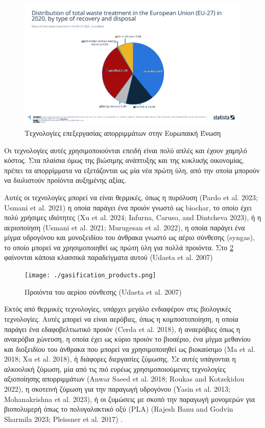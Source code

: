 \documentclass[11pt]{article}
\begin{document}
\begin{figure}[htbp]
\centering
\includegraphics[width=.9\linewidth]{../plots/statistics/statistic_waste_treatment_technologies_europe_2020.png}
\caption{\label{fig:org22664b2}Τεχνολογίες επεξεργασίας απορριμμάτων στην Ευρωπαική Ένωση}
\end{figure}

Οι τεχνολογίες αυτές χρησιμοποιούνται επειδή είναι πολύ απλές και έχουν χαμηλό κόστος. Στα πλαίσια όμως της βιώσιμης ανάπτυξης και της κυκλικής οικονομίας, πρέπει τα απορρίμματα να εξετάζονται ως μία νέα πρώτη ύλη, από την οποία μπορούν να διυλιστούν προϊόντα αυξημένης αξίας.

Αυτές οι τεχνολογίες μπορεί να είναι θερμικές, όπως η πυρόλυση (Pardo et al. 2023; Usmani et al. 2021) η οποία παράγει ένα προιόν γνωστό ως biochar, το οποίο έχει πολύ χρήσιμες ιδιότητες (Xu et al. 2024; Infurna, Caruso, and Dintcheva 2023), ή η αεριοποίηση (Usmani et al. 2021; Murugesan et al. 2022), η οποία παράγει ένα μίγμα υδρογόνου και μονοξειδίου του άνθρακα γνωστό ως αέριο σύνθεσης (syngas), το οποίο μπορεί να χρησιμοποιηθεί ως πρώτη ύλη για πολλά προιόντα. Στο \figurename  \ref{fig:org0e9372b} φαίνονται κάποια κλασσικά παραδείγματα αυτού (Udaeta et al. 2007)

\begin{figure}[htbp]
\centering
\texttt{[image: ./gasification\_products.png]}
\caption[Προιόντα του αερίου σύνθεσης]{\label{fig:org0e9372b}Προιόντα του αερίου σύνθεσης (Udaeta et al. 2007)}
\end{figure}

Εκτός από θερμικές τεχνολογίες, υπάρχει μεγάλο ενδιαφέρον στις βιολογικές τεχνολογίες. Αυτές μπορεί να είναι αερόβιες, όπως η κομποστοποίηση, η οποία παράγει ένα εδαφοβελτιωτικό προιόν (Cerda et al. 2018), ή αναερόβιες όπως η αναερόβια χώνευση, η οποία έχει ως κύριο προιόν το βιοαέριο, ένα μίγμα μεθανίου και διοξειδίου του άνθρακα που μπορεί να χρησιμοποιηθεί ως βιοκαύσιμο (Ma et al. 2018; Xu et al. 2018), ή διάφορες διεργασίες ζύμωσης. Σε αυτές υπάγονται η αλκοολική ζύμωση, μία από τις πιό ευρέως χρησιμοποιούμενες τεχνολογίες αξιοποίησης απορριμμάτων (Anwar Saeed et al. 2018; Roukas and Kotzekidou 2022), η σκοτεινή ζύμωση για την παραγωγή υδρογόνου (Yasin et al. 2013; Mohanakrishna et al. 2023), ή οι ζυμώσεις με σκοπό την παραγωγή μονομερών για βιοπολυμερή όπως το πολυγαλακτικό οξύ (PLA) (Rajesh Banu and Godvin Sharmila 2023; Pleissner et al. 2017) .
\end{document}
